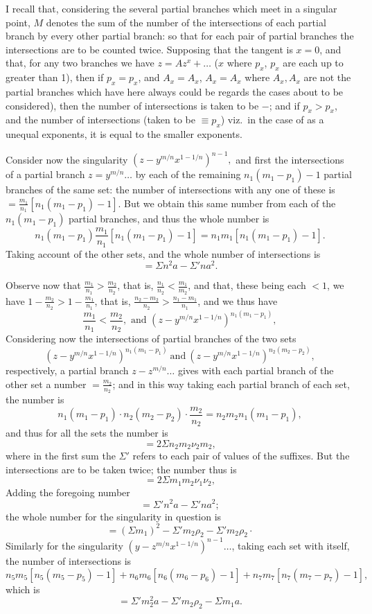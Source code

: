 \documentclass[11pt,a4paper]{book}
\begin{document}
I recall that, considering the several partial branches which meet in a singular point, $M$ denotes the sum of the number of the intersections of each partial branch by every other partial branch: so that for each pair of partial branches the intersections are to be counted twice. Supposing that the tangent is $x=0$, and that, for any two branches we have $z=Az^x+\dots$ ($x$ where $p_x$, $p_x$ are each up to greater than 1), then if $p_x=p_x$, and $A_x=A_x$, $A_x=A_x$ where $A_x, A_x$ are not the partial branches which have here always could be regards the cases about to be considered), then the number of intersections is taken to be $-$; and if $p_x>p_x$, and the number of intersections (taken to be $\equiv p_x$) viz.\ in the case of as a unequal exponents, it is equal to the smaller exponents.

Consider now the singularity $\left(z-y^{m/n}x^{1-1/n}\right)^{n-1},$ and first the intersections of a partial branch $z=y^{m/n}\dots$ by each of the remaining $n_1(m_1-p_1)-1$ partial branches of the same set: the number of intersections with any one of these is $=\frac{m_1}{n_1}\left[n_1(m_1-p_1)-1\right]$. But we obtain this same number from each of the $n_1(m_1-p_1)$ partial branches, and thus the whole number is
\[
n_1\left(m_1-p_1\right)\frac{m_1}{n_1}\left[n_1(m_1-p_1)-1\right]=n_1m_1\left[n_1(m_1-p_1)-1\right].
\]
Taking account of the other sets, and the whole number of intersections is
\[
=\Sigma n^2 a-\Sigma' n a^2.
\]

\newpage
Observe now that $\frac{m_1}{n_1}>\frac{m_2}{n_2}$, that is, $\frac{n_1}{n_2}<\frac{m_1}{m_2}$, and that, these being each $<1$, we have $1-\frac{m_2}{n_2}>1-\frac{m_1}{n_1}$, that is, $\frac{n_2-m_2}{n_2}>\frac{n_1-m_1}{n_1}$, and we thus have
\[
\frac{m_1}{n_1}<\frac{m_2}{n_2}, \text{ and } \left(z-y^{m/n}x^{1-1/n}\right)^{n_1(m_1-p_1)},
\]
Considering now the intersections of partial branches of the two sets
\[
\left(z-y^{m/n}x^{1-1/n}\right)^{n_1(m_1-p_1)}\ \text{and}\ \left(z-y^{m/n}x^{1-1/n}\right)^{n_2(m_2-p_2)},
\]
respectively, a partial branch $z-z^{m/n}\dots$ gives with each partial branch of the other set a number $=\frac{m_2}{n_2}$; and in this way taking each partial branch of each set, the number is
\[
n_1(m_1-p_1)\cdot n_2(m_2-p_2)\cdot \frac{m_2}{n_2}=n_2 m_2 n_1(m_1-p_1),
\]
and thus for all the sets the number is
\[
=2\Sigma n_2 m_2 \nu_2 m_2,
\]
where in the first sum the $\Sigma'$ refers to each pair of values of the suffixes. But the intersections are to be taken twice; the number thus is
\[
=2\Sigma m_1 m_2 \nu_1 \nu_2,
\]
Adding the foregoing number
\[
=\Sigma' n^2 a-\Sigma' n a^2;
\]
the whole number for the singularity in question is
\[
=(\Sigma m_1)^2-\Sigma' m_2 \rho_2-\Sigma' m_2 \rho_2 \cdot
\]
Similarly for the singularity $\left(y-z^{m/n}x^{1-1/n}\right)^{n-1}\dots$, taking each set with itself, the number of intersections is
\[
n_5 m_5 \left[n_5(m_5-p_5)-1\right] + n_6 m_6 \left[n_6(m_6-p_6)-1\right]+ n_7 m_7\left[n_7(m_7-p_7)-1\right],
\]
which is
\[
=\Sigma' m_2^2 a-\Sigma' m_2 \rho_2-\Sigma m_1 a.
\]
\end{document}
